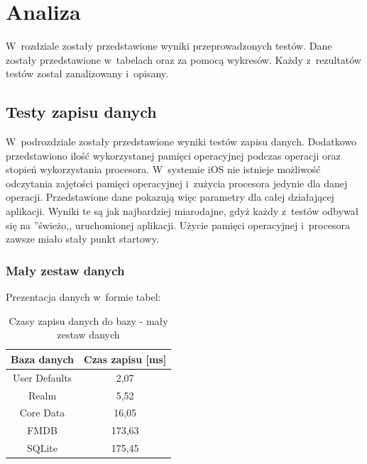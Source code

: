 \section{Analiza}

 W~rozdziale zostały przedstawione wyniki przeprowadzonych testów. Dane zostały przedstawione w~tabelach oraz za pomocą wykresów. Każdy z~rezultatów testów został zanalizowany i~opisany.

\subsection{Testy zapisu danych}
 W~podrozdziale zostały przedstawione wyniki testów zapisu danych. Dodatkowo przedstawiono ilość wykorzystanej pamięci operacyjnej podczas operacji oraz stopień wykorzystania procesora. W~systemie iOS nie istnieje możliwość odczytania zajętości pamięci operacyjnej i~zużycia procesora jedynie dla danej operacji. Przedstawione dane pokazują więc parametry dla całej działającej aplikacji. Wyniki te są jak najbardziej miarodajne, gdyż każdy z~testów odbywał się na ''świeżo,, uruchomionej aplikacji. Użycie pamięci operacyjnej i~procesora zawsze miało stały punkt startowy. 

\subsubsection{Mały zestaw danych}

Prezentacja danych w~formie tabel: 

\begin{table}[h]
\centering
\caption{Czasy zapisu danych do bazy - mały zestaw danych}
\label{tab: small-save-time-table}
\begin{tabular}{|c|c|}
\hline
Baza danych   & Czas zapisu [ms] \\ \hline
User Defaults & 2,07             \\ \hline
Realm         & 5,52             \\ \hline
Core Data     & 16,05            \\ \hline
FMDB          & 173,63           \\ \hline
SQLite        & 175,45           \\ \hline
\end{tabular}
\end{table}

